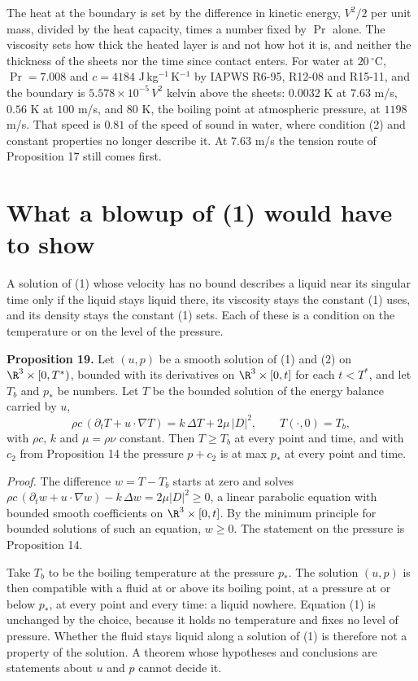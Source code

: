 The heat at the boundary is set by the difference in kinetic energy, $V^2/2$ per unit mass,
divided by the heat capacity, times a number fixed by $\Pr$ alone. The viscosity sets how thick
the heated layer is and not how hot it is, and neither the thickness of the sheets nor the time
since contact enters. For water at $20\,^\circ$C, $\Pr = 7.008$ and $c = 4184$
J\,kg$^{-1}$\,K$^{-1}$ by IAPWS R6-95, R12-08 and R15-11, and the boundary is
$5.578\times10^{-5}\,V^2$ kelvin above the sheets: $0.0032$ K at $7.63$ m/s, $0.56$ K at
$100$ m/s, and $80$ K, the boiling point at atmospheric pressure, at $1198$ m/s. That speed is
$0.81$ of the speed of sound in water, where condition (2) and constant properties no longer
describe it. At $7.63$ m/s the tension route of Proposition 17 still comes first.

\section{What a blowup of (1) would have to show}

A solution of (1) whose velocity has no bound describes a liquid near its singular time only if the
liquid stays liquid there, its viscosity stays the constant (1) uses, and its density stays the
constant (1) sets. Each of these is a condition on the temperature or on the level of the pressure.

\textbf{Proposition 19.} Let $(u,p)$ be a smooth solution of (1) and (2) on $\R^3\times[0,T^*)$,
bounded with its derivatives on $\R^3\times[0,t]$ for each $t < T^*$, and let $T_b$ and $p_*$ be
numbers. Let $T$ be the bounded solution of the energy balance carried by $u$,
\[
\rho c\,(\partial_t T + u\cdot\nabla T) = k\,\Delta T + 2\mu\,|D|^2, \qquad T(\cdot,0) = T_b,
\]
with $\rho c$, $k$ and $\mu = \rho\nu$ constant. Then $T \ge T_b$ at every point and time, and with
$c_2$ from Proposition 14 the pressure $p + c_2$ is at max $p_*$ at every point and time.

\emph{Proof.} The difference $w = T - T_b$ starts at zero and solves
$\rho c\,(\partial_t w + u\cdot\nabla w) - k\,\Delta w = 2\mu|D|^2 \ge 0$, a linear parabolic
equation with bounded smooth coefficients on $\R^3\times[0,t]$. By the minimum principle for
bounded solutions of such an equation, $w \ge 0$. The statement on the pressure is
Proposition 14. \hfill\qedsymbol

Take $T_b$ to be the boiling temperature at the pressure $p_*$. The solution $(u,p)$ is then
compatible with a fluid at or above its boiling point, at a pressure at or below $p_*$, at every
point and every time: a liquid nowhere. Equation (1) is unchanged by the choice, because it holds no
temperature and fixes no level of pressure. Whether the fluid stays liquid along a solution of (1)
is therefore not a property of the solution. A theorem whose hypotheses and conclusions are
statements about $u$ and $p$ cannot decide it.

